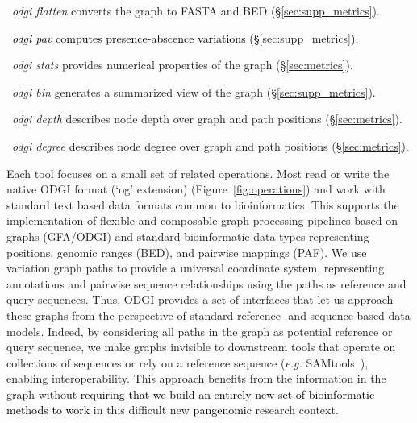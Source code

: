 \documentclass{bioinfo}
\newcommand{\REVIEWED}[1]{{\textcolor{Black}{#1}}}
\begin{document}
\begin{itemize}
\item~\textit{odgi flatten} converts the graph to FASTA and BED (\S\ref{sec:supp_metrics}).
\REVIEWED{\item~\textit{odgi pav} computes presence-abscence variations (\S\ref{sec:supp_metrics}).}
\item~\textit{odgi stats} provides numerical properties of the graph (\S\ref{sec:metrics}).
\item~\textit{odgi bin} generates a summarized view of the graph (\S\ref{sec:supp_metrics}).
\item~\textit{odgi depth} describes node depth over graph and path positions (\S\ref{sec:metrics}).
\item~\textit{odgi degree} describes node degree over graph and path positions (\S\ref{sec:metrics}).
\end{itemize}

Each tool focuses on a small set of related operations.
Most read or write the native ODGI format (`og' extension) (Figure~\ref{fig:operations}) and work with standard text based data formats common to bioinformatics.
This supports the implementation of flexible and composable graph processing pipelines based on graphs (GFA/ODGI) and standard bioinformatic data types representing positions, genomic ranges (BED), and pairwise mappings (PAF).
We use variation graph paths to provide a universal coordinate system, representing annotations and pairwise sequence relationships using the paths as reference and query sequences.
Thus, ODGI provides a set of interfaces that let us approach these graphs from the perspective of standard reference- and sequence-based data models.
Indeed, by considering all paths in the graph as potential reference or query sequence, we make graphs invisible to downstream tools that operate on collections of sequences or rely on a reference sequence (\textit{e.g.} SAMtools~\citep{Li2009}), enabling interoperability.
This approach benefits from the information in the graph without \REVIEWED{requiring that we build an entirely new set of bioinformatic methods to work} in this difficult new \REVIEWED{pangenomic} research context.
\end{document}
